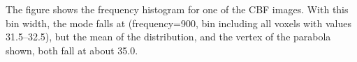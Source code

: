 \label{fig:smoothed_mode} The figure shows the frequency histogram for one of the CBF images. With this bin width, the mode falls at  (frequency=900, bin including all voxels with values 31.5--32.5), but the mean of the distribution, and the vertex of the parabola shown, both fall at about 35.0.